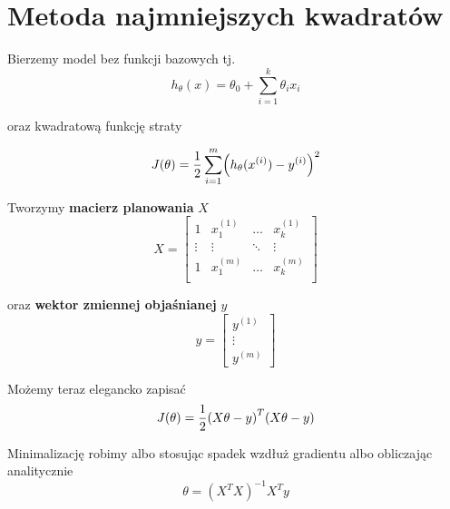 \section{Metoda najmniejszych kwadratów}

Bierzemy model bez funkcji bazowych tj.
\[
	h_\theta(x) = \theta_0 + \sum_{i=1}^k \theta_i x_i
\]

oraz kwadratową funkcję straty

\[
	J(\theta) = \frac{1}{2} \sum_{i=1}^m \pars{h_\theta(x^{(i)}) - y^{(i)}}^2
\]

Tworzymy \textbf{macierz planowania} \( X \)
\[
	X = \begin{bmatrix}
		1      & x^{(1)}_1 & \hdots & x^{(1)}_k \\
		\vdots & \vdots    & \ddots & \vdots    \\
		1      & x^{(m)}_1 & \hdots & x^{(m)}_k \\
	\end{bmatrix}
\]

oraz \textbf{wektor zmiennej objaśnianej} \( y \)
\[
	y = \begin{bmatrix}
		y^{(1)} \\
		\vdots  \\
		y^{(m)}
	\end{bmatrix}
\]

Możemy teraz elegancko zapisać
\[
	J(\theta) = \frac{1}{2}\pars{X\theta - y}^T\pars{X\theta - y}
\]

Minimalizację robimy albo stosując spadek wzdłuż gradientu albo obliczając analitycznie
\[
	\theta = (X^TX)^{-1}X^Ty
\]